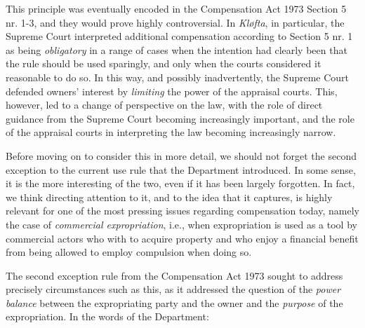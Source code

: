\documentclass[10pt]{article} %
\begin{document}
This principle was eventually encoded in the Compensation Act 1973 Section 5 nr. 1-3, and they would prove highly controversial. In \emph{Kløfta}, in particular, the Supreme Court interpreted additional compensation according to Section 5 nr. 1 as being \emph{obligatory} in a range of cases when the intention had clearly been that the rule should be used sparingly, and only when the courts considered it reasonable to do so. In this way, and possibly inadvertently, the Supreme Court defended owners' interest by \emph{limiting} the power of the appraisal courts. This, however, led to a change of perspective on the law, with the role of direct guidance from the Supreme Court becoming increasingly important, and the role of the appraisal courts in interpreting the law becoming increasingly narrow.

Before moving on to consider this in more detail, we should not forget the second exception to the current use rule that the Department introduced. In some sense, it is the more interesting of the two, even if it has been largely forgotten. In fact, we think directing attention to it, and to the idea that it captures, is highly relevant for one of the most pressing issues regarding compensation today, namely the case of \emph{commercial expropriation}, i.e., when expropriation is used as a tool by commercial actors who with to acquire property and who enjoy a financial benefit from being allowed to employ compulsion when doing so. 

The second exception rule from the Compensation Act 1973 sought to address precisely circumstances such as this, as it addressed the question of the \emph{power balance} between the expropriating party and the owner and the \emph{purpose} of the expropriation. In the words of the Department:
\end{document}
